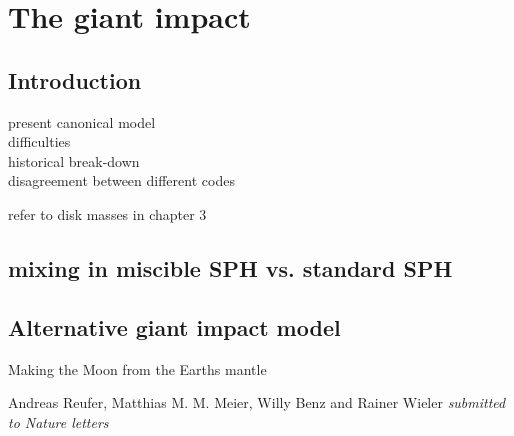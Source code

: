 \chapter{The giant impact}
\label{ch05}
\graphicspath{{./05figs/}}

\section{Introduction}
present canonical model\\
difficulties\\
historical break-down\\
disagreement between different codes\\

\citep{Canup:2010p3713}

refer to disk masses in chapter 3\\


\section{mixing in miscible SPH vs. standard SPH}


\section{Alternative giant impact model}


Making the Moon from the Earths mantle




Andreas Reufer, Matthias M. M. Meier, Willy Benz and Rainer Wieler
\emph{submitted to Nature letters}

